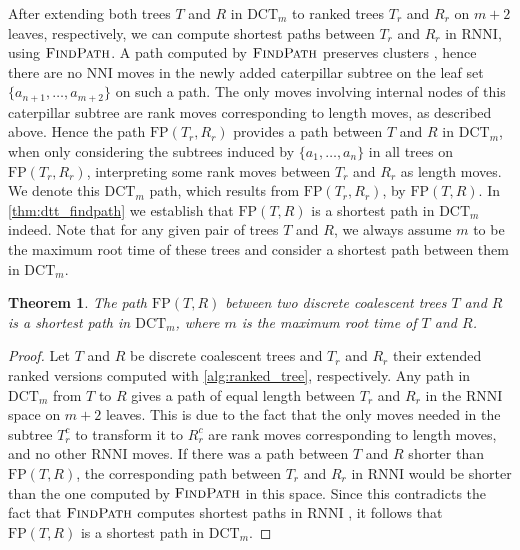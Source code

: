 \documentclass[11pt]{amsart}
\newtheorem{theorem}{Theorem}
\newcommand{\rnni}{\mathrm{RNNI}}
\newcommand{\findpath}{\textsc{FindPath}}
\newcommand{\nni}{\mathrm{NNI}}
\newcommand{\fp}{\mathrm{FP}}
\newcommand{\dtt}{\mathrm{DCT}}
\newcommand{\summary}[1]{} %
\begin{document}
\summary{How to compute shortest $\dtt_m$-paths between trees with $\findpath$}
After extending both trees $T$ and $R$ in $\dtt_m$ to ranked trees $T_r$ and $R_r$ on $m+2$ leaves, respectively, we can compute shortest paths between $T_r$ and $R_r$ in $\rnni$, using $\findpath$.
A path computed by $\findpath$ preserves clusters \autocite{Collienne2020-iu}, hence there are no $\nni$ moves in the newly added caterpillar subtree on the leaf set $\{a_{n+1}, \ldots, a_{m+2}\}$ on such a path.
The only moves involving internal nodes of this caterpillar subtree are rank moves corresponding to length moves, as described above.
Hence the path $\fp(T_r,R_r)$ provides a path between $T$ and $R$ in $\dtt_m$, when only considering the subtrees induced by $\{a_1, \ldots, a_n\}$ in all trees on $\fp(T_r, R_r)$, interpreting some rank moves between $T_r$ and $R_r$ as length moves.
We denote this $\dtt_m$ path, which results from $\fp(T_r, R_r)$, by $\fp(T,R)$.
In \autoref{thm:dtt_findpath} we establish that $\fp(T,R)$ is a shortest path in $\dtt_m$ indeed.
Note that for any given pair of trees $T$ and $R$, we always assume $m$ to be the maximum root time of these trees and consider a shortest path between them in $\dtt_m$.

\begin{theorem}
	The path $\fp(T,R)$ between two discrete coalescent trees $T$ and $R$ is a shortest path in $\dtt_m$, where $m$ is the maximum root time of $T$ and $R$.
	\label{thm:dtt_findpath}
\end{theorem}

\begin{proof}
	Let $T$ and $R$ be discrete coalescent trees and $T_r$ and $R_r$ their extended ranked versions computed with \autoref{alg:ranked_tree}, respectively.
	Any path in $\dtt_m$ from $T$ to $R$ gives a path of equal length between $T_r$ and $R_r$ in the $\rnni$ space on $m+2$ leaves.
	This is due to the fact that the only moves needed in the subtree $T_r^c$ to transform it to $R_r^c$ are rank moves corresponding to length moves, and no other $\rnni$ moves.
	If there was a path between $T$ and $R$ shorter than $\fp(T,R)$, the corresponding path between $T_r$ and $R_r$ in $\rnni$ would be shorter than the one computed by $\findpath$ in this space.
	Since this contradicts the fact that $\findpath$ computes shortest paths in $\rnni$ \autocite[Theorem 1]{Collienne2020-iu}, it follows that $\fp(T,R)$ is a shortest path in $\dtt_m$.
\end{proof}
\end{document}
